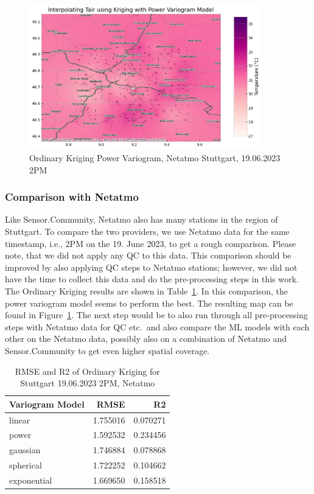 \begin{figure}[ht]
    \centering
    \includegraphics[width=0.9\textwidth]{images/eval areal interpolation ok stuttgart 14h netatmo.png}
    \caption{Ordinary Kriging Power Variogram, Netatmo Stuttgart, 19.06.2023 2PM}
    \label{fig:eval areal interpolation ok 14h stuttgart netatmo}
\end{figure}

\subsubsection{Comparison with Netatmo}

Like Sensor.Community, Netatmo also has many stations in the region of Stuttgart. To compare the two providers, we use Netatmo data for the same timestamp, i.e., 2PM on the 19. June 2023, to get a rough comparison. Please note, that we did not apply any QC to this data. This comparison should be improved by also applying QC steps to Netatmo stations; however, we did not have the time to collect this data and do the pre-processing steps in this work. The Ordinary Kriging results are shown in Table~\ref{tab: areal interpolation ok 2pm netatmo stuttgart}. In this comparison, the power variogram model seems to perform the best. The resulting map can be found in Figure~\ref{fig:eval areal interpolation ok 14h stuttgart netatmo}. The next step would be to also run through all pre-processing steps with Netatmo data for QC etc.\ and also compare the ML models with each other on the Netatmo data, possibly also on a combination of Netatmo and Sensor.Community to get even higher spatial coverage.

\begin{table}[ht]
  \centering
  \begin{tabular}{lrr}
  \toprule
  Variogram Model &     RMSE &       R2 \\
  \midrule
          linear & 1.755016 & 0.070271 \\
            power & 1.592532 & 0.234456 \\
        gaussian & 1.746884 & 0.078868 \\
        spherical & 1.722252 & 0.104662 \\
      exponential & 1.669650 & 0.158518 \\
  \bottomrule
  \end{tabular}
  \label{tab: areal interpolation ok 2pm netatmo stuttgart}
  \caption{RMSE and R2 of Ordinary Kriging for Stuttgart 19.06.2023 2PM, Netatmo}
\end{table}

